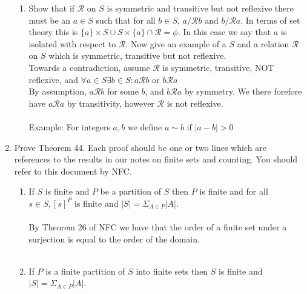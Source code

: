 \documentclass[11pt]{article}
\begin{document}
\begin{enumerate}
\begin{enumerate}
\item Show that if $\mathcal{R}$ on $S$ is symmetric and transitive but not reflexive there must be an $a \in S$ such that for all $b \in S$, $a /\mathcal{R} b$ and $b  /\mathcal{R} a$. In terms of set theory this is $\{a\} \times S \cup S \times \{a\} \cap \mathcal{R} = \phi$. In this case we say that $a$ is isolated with respect to $\mathcal{R}$. Now give an example of a $S$ and a relation $\mathcal{R}$ on $S$ which is symmetric, transitive but not reflexive.
\\
Towards a contradiction, assume $\mathcal{R}$ is symmetric, transitive, NOT reflexive, and $\forall a \in S \exists b \in S: a\mathcal{R}b$ or $b\mathcal{R}a$
\\
By assumption, $a \mathcal{R} b$ for some $b$, and $b \mathcal{R} a$ by symmetry.  We there forefore have $a \mathcal{R} a$ by transitivity, however $\mathcal{R}$ is not reflexive.
\\
\\
Example: For integers $a,b$ we define $a \sim b$ if $|a-b| > 0$
\end{enumerate}

\newpage %
\item Prove Theorem 44. Each proof should be one or two lines which are references to the results in our notes on finite sets and counting. You should refer to this document by NFC.
\begin{enumerate}
\item If $S$ is finite and $P$ be a partition of $S$ then $P$ is finite and for all $s \in S, [s]^P$ is finite and $|S| = \Sigma_{A \in P}|A|$.
\\
\\
By Theorem 26 of NFC we have that the order of a finite set under a surjection is equal to the order of the domain.
\\
\\

\item If $P$ is a finite partition of $S$ into finite sets then $S$ is finite and $|S| = \Sigma_{A \in P}|A|$.
\\
\\
\\
\\
\\
\\
\\

\end{enumerate}


\end{enumerate}
\end{document}
